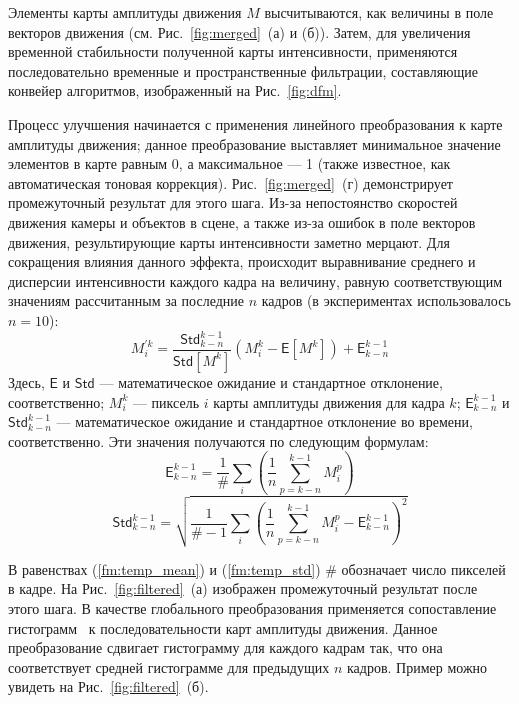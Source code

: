 \documentclass[14pt, a4paper]{extarticle}
\begin{document}
Элементы карты амплитуды движения $M$ высчитываются, как величины в поле векторов 
движения (см. Рис.~\ref{fig:merged}~(а) и (б)). Затем, для увеличения временной стабильности
полученной карты интенсивности, применяются последовательно временные и пространственные 
фильтрации, составляющие конвейер алгоритмов, изображенный на Рис.~\ref{fig:dfm}.

Процесс улучшения начинается с применения линейного преобразования к карте амплитуды движения;
данное преобразование выставляет минимальное значение элементов в карте равным 0, а максимальное --- 1
(также известное, как автоматическая тоновая коррекция). Рис.~\ref{fig:merged}~(г) демонстрирует
промежуточный результат для этого шага. Из-за непостоянство скоростей движения камеры 
и объектов в сцене, а также из-за ошибок в поле векторов движения, результирующие карты 
интенсивности заметно мерцают. Для сокращения влияния данного эффекта, происходит 
выравнивание среднего и дисперсии интенсивности каждого кадра на величину, равную 
соответствующим значениям рассчитанным за последние $n$ кадров (в экспериментах использовалось $n = 10$):
\begin{equation}
M_{i}^{'k} = \frac{\mathsf{Std}_{k-n}^{k-1}}{\mathsf{Std}\left[M^k\right]} \left( M_i^k - \mathsf{E}\left[M^k\right]\right) + \mathsf{E}_{k-n}^{k-1}
\end{equation}
Здесь, $\mathsf{E}$ и $\mathsf{Std}$ --- математическое ожидание и стандартное отклонение, соответственно; 
$M^k_i$ --- пиксель $i$ карты амплитуды движения для кадра $k$; $\mathsf{E}_{k-n}^{k-1}$ и 
$\mathsf{Std}_{k-n}^{k-1}$ --- математическое ожидание и стандартное отклонение во времени, соответственно. 
Эти значения получаются по следующим формулам:
\begin{equation}
\mathsf{E}_{k-n}^{k-1} =  \frac{1}{\#} \sum_{i}\left(\frac{1}{n}\sum_{p=k-n}^{k-1}M_i^p\right)
\label{fm:temp_mean}
\end{equation}
\begin{equation}
\mathsf{Std}_{k-n}^{k-1} = \sqrt{\frac{1}{\# - 1} \sum_{i}\left(\frac{1}{n}\sum_{p=k-n}^{k-1}M_i^p - \mathsf{E}_{k-n}^{k-1}\right)^2}
\label{fm:temp_std}
\end{equation}



В равенствах (\ref{fm:temp_mean}) и (\ref{fm:temp_std}) $\#$ обозначает число пикселей в кадре.
На Рис.~\ref{fig:filtered}~(а) изображен промежуточный результат после этого шага. В качестве
глобального преобразования применяется сопоставление гистограмм~\cite{fecker2007time}
к последовательности карт амплитуды движения. Данное преобразование сдвигает 
гистограмму для каждого кадрам так, что она соответствует средней гистограмме 
для предыдущих  $n$ кадров. Пример можно увидеть на Рис.~\ref{fig:filtered}~(б).
\end{document}
